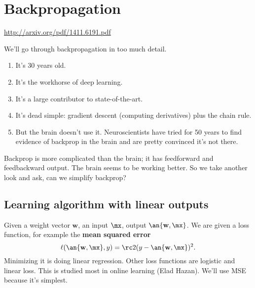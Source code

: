 \def\filepath{C:/Users/Owner/Dropbox/Math/templates}





%


%

\pagestyle{fancy}
\chead{} 
\rhead{} 
\lfoot{} 
\cfoot{\thepage} 
\rfoot{} 
\renewcommand{\headrulewidth}{.3pt} 
\setlength\voffset{0in}
\setlength\textheight{648pt}


\section{Backpropagation}
\url{http://arxiv.org/pdf/1411.6191.pdf}

We'll go through backpropagation in too much detail. 
\begin{enumerate}
\item It's 30 years old.
\item It's the workhorse of deep learning.
\item It's a large contributor to state-of-the-art.
\item It's dead simple: gradient descent (computing derivatives) plus the chain rule.
\item But the brain doesn't use it. Neuroscientists have tried for 50 years to find evidence of backprop in the brain and are pretty convinced it's not there.
\end{enumerate}
Backprop is more complicated than the brain; %
it has feedforward and feedbackward output. The brain seems to be working better. So we take another look and ask, can we simplify backprop?

\subsection{Learning algorithm with linear outputs}

Given a weight vector $\mathbf w$, an input $\mx$, output $\an{\mathbf w,\mx}$. We are given a loss function, for example the \textbf{mean squared error}
\[
\ell(\an{\mathbf w,\mx},y)=\rc 2(y-\an{\mathbf w,\mx})^2.
\]
Minimizing it is doing linear regression.
Other loss functions are logistic and linear loss. This is studied most in online learning (Elad Hazan). We'll use MSE because it's simplest.

